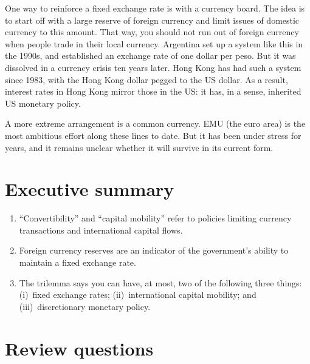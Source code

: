 One way to reinforce a fixed exchange rate is with a currency board.
The idea is to start off with a large reserve of foreign currency
and limit issues of domestic currency to this amount.
That way, you should not run out of foreign currency when people trade
in their local currency.
Argentina set up a system like this in the 1990s, and established
an exchange rate of one dollar per peso.
But it was dissolved in a currency crisis ten years later.
Hong Kong has had such a system since 1983, with the Hong Kong dollar
pegged to the US dollar.
As a result, interest rates in Hong Kong mirror those in the US:
it has, in a sense, inherited US monetary policy.


A more extreme arrangement is a common currency.
EMU (the euro area) is the most ambitious effort along these lines to date.
But it has been under stress for years, and it remains unclear whether
it will survive in its current form.


\section*{Executive summary}

\begin{enumerate}
\item ``Convertibility'' and ``capital mobility'' refer to
policies limiting currency transactions and international capital flows.

\item Foreign currency reserves are an indicator of the
government's ability to maintain a fixed exchange rate.

\item The trilemma says you can have, at most, two of the following three
things:
(i)~fixed exchange rates;
(ii)~international capital mobility; and
(iii)~discretionary monetary policy.
\end{enumerate}

\section*{Review questions}

